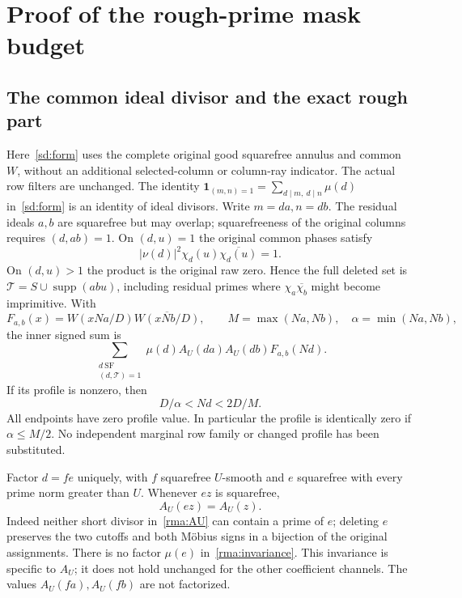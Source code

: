 \documentclass[11pt]{article}
\theoremstyle{definition}\newtheorem{definition}[theorem]{Definition}
\theoremstyle{remark}\newtheorem{remark}[theorem]{Remark}
\begin{document}
\section{Proof of the rough-prime mask budget}\label{rma:details}
\subsection{The common ideal divisor and the exact rough part}
Here~\eqref{sd:form} uses the complete original good squarefree
annulus and common $W$, without an additional selected-column or
column-ray indicator. The actual row filters are unchanged.
The identity $\mathbf1_{(m,n)=1}=\sum_{d\mid m,\ d\mid n}\mu(d)$
in~\eqref{sd:form} is an identity of ideal divisors. Write $m=da,n=db$.
The residual ideals $a,b$ are squarefree but may overlap; squarefreeness
of the original columns requires $(d,ab)=1$. On $(d,u)=1$ the original
common phases satisfy
\[
 |\nu(d)|^2\chi_d(u)\overline{\chi_d(u)}=1.
\]
On $(d,u)>1$ the product is the original raw zero. Hence the full deleted
set is $\mathcal T=S\cup\operatorname{supp}(abu)$, including residual
primes where $\chi_a\overline{\chi_b}$ might become imprimitive.
With
\[
 F_{a,b}(x)=W(xNa/D)\overline{W(xNb/D)},\qquad
 M=\max(Na,Nb),\quad\alpha=\min(Na,Nb),
\]
the inner signed sum is
\begin{equation}\label{rma:inner}
 \sum_{\substack{d\ \mathrm{SF}\\(d,\mathcal T)=1}}
             \mu(d)A_U(da)A_U(db)F_{a,b}(Nd).
\end{equation}
If its profile is nonzero, then
\begin{equation}\label{rma:support}
 D/\alpha<Nd<2D/M.
\end{equation}
All endpoints have zero profile value. In particular the profile is
identically zero if $\alpha\le M/2$. No independent marginal row family
or changed profile has been substituted.

Factor $d=fe$ uniquely, with $f$ squarefree $U$-smooth and $e$ squarefree
with every prime norm greater than $U$. Whenever $ez$ is squarefree,
\begin{equation}\label{rma:invariance}
 A_U(ez)=A_U(z).
\end{equation}
Indeed neither short divisor in~\eqref{rma:AU} can contain a prime of
$e$; deleting $e$ preserves the two cutoffs and both M\"obius signs in
a bijection of the original assignments. There is no factor $\mu(e)$
in~\eqref{rma:invariance}. This invariance is specific to $A_U$; it does
not hold unchanged for the other coefficient channels. The values
$A_U(fa),A_U(fb)$ are not factorized.
\end{document}
